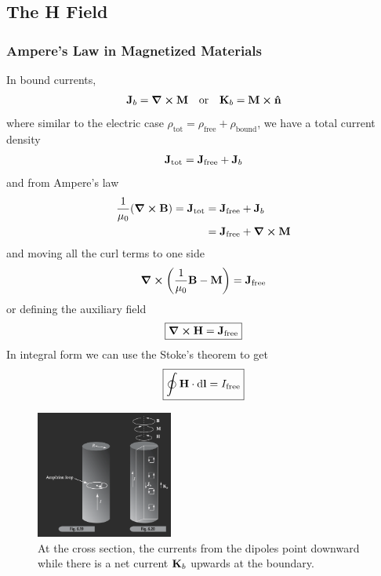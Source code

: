 \documentclass[../main.tex]{subfiles}
\begin{document}
\newpage
{}
\subsection{The H Field}

\subsubsection{Ampere's Law in Magnetized Materials}
In bound currents,
\begin{align*}
    \vb J_b = \curl \vb M \qor \vb K_b = \vb M \cross \vu n
\end{align*}
where similar to the electric case $\rho_\text{tot} = \rho_\text{free} + \rho_\text{bound}$, 
we have a total current density
\begin{align*}
    \vb J_\text{tot} = \vb J_\text{free} + \vb J_b
\end{align*}
and from Ampere's law
\begin{align*}
    \frac{1}{\mu_0} (\curl \vb B) = \vb J_\text{tot} &= \vb J_\text{free} + \vb J_b \\
    &= \vb J_\text{free} + \curl \vb M
\end{align*}
and moving all the curl terms to one side
\begin{align*}
    \curl \qt(\frac{1}{\mu_0} \vb B - \vb M) = \vb J_\text{free}
\end{align*}
or defining the auxiliary field 
\begin{align*}
    \boxed{\curl \vb H = \vb J_\text{free}}
\end{align*}
In integral form we can use the Stoke's theorem to get
\begin{align*}
    \boxed{
        \oint \vb H \cdot \dd{\vb l} = I_\text{free}
    }
\end{align*}

\begin{figure}[ht]
    \centering
    \includegraphics[width=0.4\textwidth]{fig6_19_20.png}
    \caption{At the cross section, the currents from the dipoles point downward while there is a net current $\vb K_b$ upwards at the boundary.}
    \label{fig:gr6_19}
\end{figure}
\end{document}

